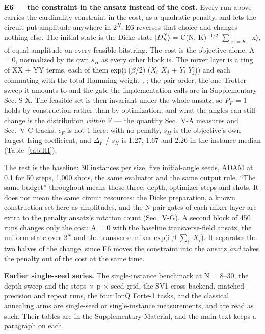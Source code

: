 \documentclass[journal]{IEEEtran}
\begin{document}
\textbf{E6 --- the constraint in the ansatz instead of the cost.} Every run above carries the cardinality constraint in the cost, as a quadratic penalty, and lets the circuit put amplitude anywhere in 2$^{N}$. E6 reverses that choice and changes nothing else. The initial state is the Dicke state $|$$D^{N}_{K}$$\rangle$ = C(N, K)$^{-1/2}$ $\sum_{|x| = K}$ $|$x$\rangle$, of equal amplitude on every feasible bitstring. The cost is the objective alone, A = 0, normalized by its own $s_{H}$ as every other block is. The mixer layer is a ring of XX + YY terms, each of them exp(i ($\beta$/2) ($X_{i}$ $X_{j}$ + $Y_{i}$ $Y_{j}$)) and each commuting with the total Hamming weight \cite{ref11}, \cite{ref12}; the pair order, the one Trotter sweep it amounts to and the gate the implementation calls are in Supplementary Sec. S-X. The feasible set is then invariant under the whole ansatz, so $P_{F}$ = 1 holds by construction rather than by optimization, and what the angles can still change is the distribution \textit{within} F --- the quantity Sec.~V-A measures and Sec.~V-C tracks. $\epsilon_{F}$ is not 1 here: with no penalty, $s_{H}$ is the objective's own largest Ising coefficient, and $\Delta_{F}$ / $s_{H}$ is 1.27, 1.67 and 2.26 in the instance median (Table~\ref{tab:III}).


The rest is the baseline: 30 instances per size, five initial-angle seeds, ADAM at 0.1 for 50 steps, 1,000 shots, the same evaluator and the same output rule. ``The same budget'' throughout means those three: depth, optimizer steps and shots. It does not mean the same circuit resources: the Dicke preparation, a known construction \cite{ref48} set here as amplitudes, and the N pair gates of each mixer layer are extra to the penalty ansatz's rotation count (Sec.~V-G). A second block of 450 runs changes only the cost: A = 0 with the baseline transverse-field ansatz, the uniform state over 2$^{N}$ and the transverse mixer exp(i $\beta$ $\sum_{i}$ $X_{i}$). It separates the two halves of the change, since E6 moves the constraint into the ansatz \textit{and} takes the penalty out of the cost at the same time.


\textbf{Earlier single-seed series.} The single-instance benchmark at N = 8--30, the depth sweep and the steps $\times$ p $\times$ seed grid, the SV1 cross-backend, matched-precision and repeat runs, the four IonQ Forte-1 tasks, and the classical annealing arms are single-seed or single-instance measurements, and are read as such. Their tables are in the Supplementary Material, and the main text keeps a paragraph on each.
\end{document}
